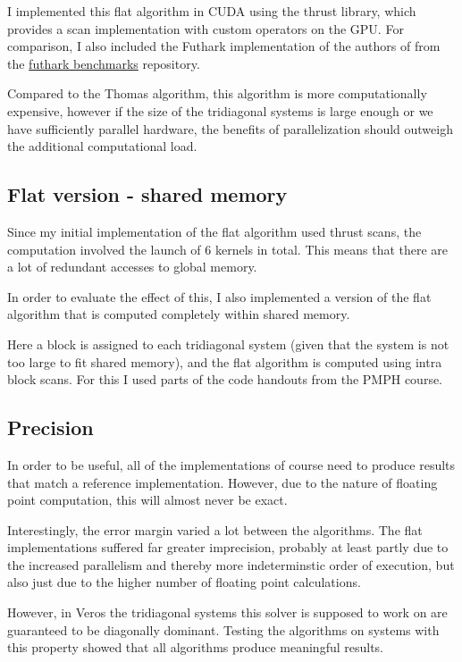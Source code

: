 \documentclass[a4paper,oneside]{memoir}
\begin{document}
I implemented this flat algorithm in CUDA using the thrust library, which provides a scan implementation with custom operators on the GPU.
For comparison, I also included the Futhark implementation of the authors of \cite{andreetta2016finpar} from the 
\href{https://github.com/diku-dk/futhark-benchmarks/blob/bf5112d0841866dc7370586f2e2a7b48467d2d97/finpar/LocVolCalib.fut}{futhark benchmarks}
repository.

Compared to the Thomas algorithm, this algorithm is more computationally expensive, however if the size of the tridiagonal systems is large enough or we have sufficiently parallel hardware, the benefits of parallelization should outweigh the additional computational load.

\subsection{Flat version - shared memory}
Since my initial implementation of the flat algorithm used thrust scans, the computation involved the launch of 6 kernels in total. This means that there are a lot of redundant accesses to global memory. 

In order to evaluate the effect of this, I also implemented a version of the flat algorithm that is computed completely within shared memory.

Here a block is assigned to each tridiagonal system (given that the system is not too large to fit shared memory), and the flat algorithm is computed using intra block scans. For this I used parts of the code handouts from the PMPH course.


\subsection{Precision}
In order to be useful, all of the implementations of course need to produce results that match a reference implementation. However, due to the nature of floating point computation, this will almost never be exact.

Interestingly, the error margin varied a lot between the algorithms. The flat implementations suffered far greater imprecision, probably at least partly due to the increased parallelism and thereby more indeterminstic order of execution, but also just due to the higher number of floating point calculations.

However, in Veros the tridiagonal systems this solver is supposed to work on are guaranteed to be diagonally dominant. Testing the algorithms on systems with this property showed that all algorithms produce meaningful results.
\end{document}
